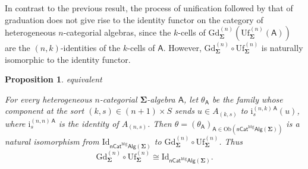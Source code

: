 \documentclass[a4paper, reqno]{amsbook}
\makeatletter
\newcommand{\sig}[1]{\mathbf{#1}}             %
\newcommand{\calg}[1]{\boldsymbol{\mathsf{#1}}} %
\newcommand{\htg}{\mathrm{htg}}                %
\newcommand{\Id}{\mathrm{Id}}
\newcommand{\Gd}{\mathrm{Gd}}
\newcommand{\Uf}{\mathrm{Uf}}
\theoremstyle{plain}
\newtheorem{proposition}[theorem]{Proposition}
\theoremstyle{definition}
\newcommand*{\CA@leanpending}{}
\newcommand*{\CA@leanrelation}{}
\newcommand*{\lean}[2]{%
  \ifcsname\string\color@lean@#1\endcsname\else
    \PackageError{main}{Unknown relation `#1' in \string\lean}{Use equivalent, weaker or stronger.}%
  \fi
  \gdef\CA@leanrelation{#1}%
  \gdef\CA@leanpending{#2}}
\makeatother
\begin{document}
In contrast to the previous result, the process of unification followed by that of graduation does not give rise to the identity functor on the category of heterogeneous $n$-categorial algebras, since the $k$-cells of $\Gd^{(n)}_{\sig{\Sigma}}(\Uf^{(n)}_{\sig{\Sigma}}(\calg{A}))$ are the $(n,k)$-identities of the $k$-cells of $\calg{A}$.
However, $\Gd^{(n)}_{\sig{\Sigma}}\circ\Uf^{(n)}_{\sig{\Sigma}}$ is naturally isomorphic to the identity functor.

\begin{proposition}\label{PGdUfIso}\lean{equivalent}{Presentations.theta,Presentations.heterogeneousPresentationTheta}
For every heterogeneous $n$-categorial $\sig{\Sigma}$-algebra $\calg{A}$, let $\theta_{\calg{A}}$ be the family whose component at the sort $(k,s)\in(n+1)\times S$ sends $u\in A_{(k,s)}$ to $\mathrm{i}^{(n,k)\,\calg{A}}_{s}(u)$, where $\mathrm{i}^{(n,n)\,\calg{A}}_{s}$ is the identity of $A_{(n,s)}$.
Then $\theta=(\theta_{\calg{A}})_{\calg{A}\in\mathrm{Ob}(\mathsf{nCat}^{\htg}\mathsf{Alg}(\sig{\Sigma}))}$ is a natural isomorphism from $\Id_{\mathsf{nCat}^{\htg}\mathsf{Alg}(\sig{\Sigma})}$ to $\Gd^{(n)}_{\sig{\Sigma}}\circ\Uf^{(n)}_{\sig{\Sigma}}$.
Thus
\[\Gd^{(n)}_{\sig{\Sigma}}\circ\Uf^{(n)}_{\sig{\Sigma}}\cong \Id_{\mathsf{nCat}^{\htg}\mathsf{Alg}(\sig{\Sigma})}.\]
\end{proposition}
\end{document}
